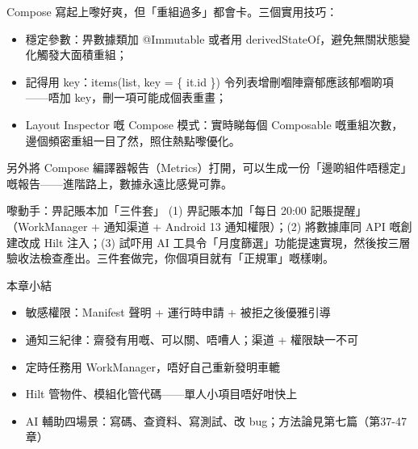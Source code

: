 
Compose 寫起上嚟好爽，但「重組過多」都會卡。三個實用技巧：

\begin{itemize}
  \item 穩定參數：畀數據類加 @Immutable 或者用 derivedStateOf，避免無關狀態變化觸發大面積重組；
  \item 記得用 key：items(list, key = \{ it.id \}) 令列表增刪嗰陣齋郁應該郁嗰啲項——唔加 key，刪一項可能成個表重畫；
  \item Layout Inspector 嘅 Compose 模式：實時睇每個 Composable 嘅重組次數，邊個頻密重組一目了然，照住熱點嚟優化。
\end{itemize}

另外將 Compose 編譯器報告（Metrics）打開，可以生成一份「邊啲組件唔穩定」嘅報告——進階路上，數據永遠比感覺可靠。

\begin{tcbpractice}{嚟動手：畀記賬本加「三件套」}
(1) 畀記賬本加「每日 20:00 記賬提醒」（WorkManager + 通知渠道 + Android 13 通知權限）；(2) 將數據庫同 API 嘅創建改成 Hilt 注入；(3) 試吓用 AI 工具令「月度篩選」功能提速實現，然後按三層驗收法檢查產出。三件套做完，你個項目就有「正規軍」嘅樣喇。

\end{tcbpractice}

\begin{tcbsummary}{本章小結}
\begin{itemize}
  \item 敏感權限：Manifest 聲明 + 運行時申請 + 被拒之後優雅引導
  \item 通知三紀律：齋發有用嘅、可以關、唔嘈人；渠道 + 權限缺一不可
  \item 定時任務用 WorkManager，唔好自己重新發明車轆
  \item Hilt 管物件、模組化管代碼——單人小項目唔好咁快上
  \item AI 輔助四場景：寫碼、查資料、寫測試、改 bug；方法論見第七篇（第37-47章）
\end{itemize}

\end{tcbsummary}
